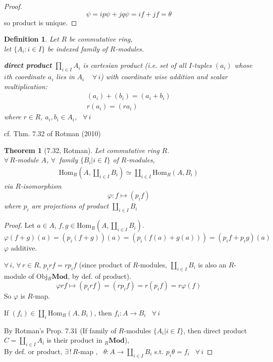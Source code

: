 \documentclass[10pt]{amsart}
\newtheorem{theorem}{Theorem}
\newtheorem{definition}{Definition}
\begin{document}
\begin{multicols*}{2}
\begin{proof}
	\[
	\psi = ip\psi + jq \psi = i f + jf = \theta
	\]
	so product is unique.  
\end{proof}

\begin{definition}
	Let $R$ be commutative ring, \\
	let $\lbrace A_i : i \in I \rbrace$ be indexed family of $R$-modules.  
	
	\textbf{direct product} $\prod_{i\in I} A_i$ is cartesian product (i.e. set of all $I$-tuples $(a_i)$ whose $i$th coordinate $a_i$ lies in $A_i \quad \, \forall \, i$) with coordinate wise addition and scalar multiplication: 
	\[
	\begin{gathered}
	(a_i) + (b_i) = (a_i + b_i) \\
	r(a_i) = (ra_i)
	\end{gathered}
	\]
	where $r\in R$, $a_i, b_i \in A_i$, \, $\forall \, i $  
\end{definition}




cf. Thm. 7.32 of Rotman (2010) \cite{JRotman2010}
\begin{theorem}[7.32, Rotman]
	Let commutative ring $R$.  \\
	$\forall \, R$-module $A$, $\forall \,$ family $\lbrace B_i | i \in I \rbrace$ of $R$-modules,
	\begin{equation}
	\begin{gathered}
	\text{Hom}_R(A, \coprod_{i\in I} B_i ) \simeq \coprod_{i \in I} \text{Hom}_R(A,B_i)
	\end{gathered}
	\end{equation}
	via $R$-isomorphism
	\[
	\varphi : f\mapsto (p_if)
	\]
	where $p_i $ are projections of product $\coprod_{i\in I }B_i$
\end{theorem}

\begin{proof}
	Let $a\in A$, $f,g \in \text{Hom}_R(A,\coprod_{i\in I} B_i)$.
	\[
	\varphi(f+g)(a) = (p_i(f+g))(a) = (p_i(f(a) + g(a))) = (p_if + p_ig)(a)
	\]
	$\varphi$ additive.
	
	$\forall \, i, \, \forall \, r \in R$, $p_i rf = rp_i f$ (since product of $R$-modules, $\coprod_{i\in I}B_i$ is also an $R$-module of $\text{Obj}{}_R\textbf{Mod}$, by def. of product).
	\[
	\varphi rf \mapsto (p_i rf) = (r p_i f) = r(p_i f) = r\varphi(f)
	\]
	So $\varphi$ is $R$-map.
	
	If $(f_i) \in \coprod_i \text{Hom}{}_R(A,B_i)$, then $f_i : A\to B_i$ \, $\forall \, i$
	
	By Rotman's Prop. 7.31 (If family of $R$-modules $\lbrace A_i | i \in I \rbrace$, then direct product $C = \coprod_{i\in I} A_i$ is their product in ${}_R \textbf{Mod}$), \\
	\phantom{ \qquad \, } By def. or product, $\exists \, ! \, R$-map , \, $\theta : A \to \coprod_{i\in I} B_i$ s.t. $p_i \theta = f_i$ \, $\forall \, i$
	

\end{proof}
\end{multicols*}
\end{document}
